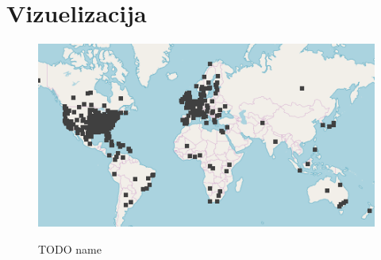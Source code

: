 \section{Vizuelizacija}
\label{sec:Vizuelizacija}

\begin{figure}[h]
    \includegraphics[scale=0.8]{resources/Geolokacija.png}
    \label{fig:Geolokacija}
    \caption{TODO name}
\end{figure}
